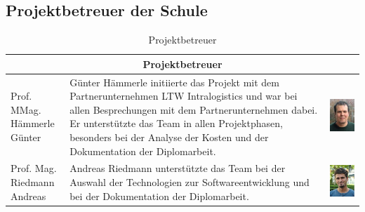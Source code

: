 \subsection{Projektbetreuer der Schule}
\begin{table}[H]
  \centering
  \begin{tabular}{lp{}c}
    \multicolumn{3}{c}{\textbf{Projektbetreuer}} \\
    \toprule
    \makecell[l]{Prof. MMag.                     \\Hämmerle Günter} & Günter Hämmerle initiierte das Projekt mit dem Partnerunternehmen LTW Intralogistics und war bei allen Besprechungen mit dem Partnerunternehmen dabei. Er unterstützte das Team in allen Projektphasen, besonders bei der Analyse der Kosten und der Dokumentation der Diplomarbeit. & \begin{minipage}{.3\textwidth} \includegraphics{images/günterhämmerle.jpg} \end{minipage} \\
    \midrule
    \makecell[l]{Prof. Mag.                      \\Riedmann Andreas} & Andreas Riedmann unterstützte das Team bei der Auswahl der Technologien zur Softwareentwicklung und bei der Dokumentation der Diplomarbeit. & \begin{minipage}{.3\textwidth}\includegraphics{images/andreasriedmann.jpg} \end{minipage} \\
    \bottomrule
  \end{tabular}
  \caption{Projektbetreuer}
  \label{tab:projektbetreuer}
\end{table}

